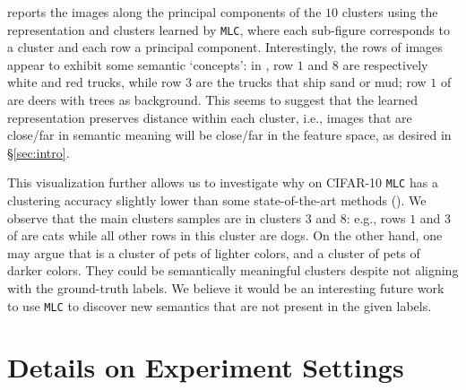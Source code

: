 \documentclass[10pt,twocolumn,letterpaper]{article}
\newcommand{\ours}{MLC}
\newcommand{\mours}{\texttt{\ours}}
\begin{document}
   
     reports the images along the principal components of the $10$ clusters using the representation and clusters learned by \mours{}, where each sub-figure corresponds to a cluster and each row a principal component. Interestingly, the rows of images appear to exhibit some semantic `concepts': in , row $1$ and $8$ are respectively white and red trucks, while row $3$ are the trucks that ship sand or mud; row $1$ of  are deers with trees as background. This seems to suggest that the learned representation preserves distance within each cluster, i.e., images that are close/far in semantic meaning will be close/far in the feature space, as desired in \S \ref{sec:intro}. 

    This visualization further allows us to investigate why on CIFAR-10 \mours{} has a clustering accuracy slightly lower than some state-of-the-art methods (). We observe that the main  clusters samples are in clusters $3$ and $8$: 
    e.g., rows $1$ and $3$ of  are cats while all other rows in this cluster are dogs. On the other hand, one may argue that  is a cluster of pets of lighter colors, and  a cluster of pets of darker colors. They could be semantically meaningful clusters despite not aligning with the ground-truth labels. We believe it would be an interesting future work to use \mours{} to discover new semantics that are not present in the given labels.

\section{Details on Experiment Settings}
\end{document}
